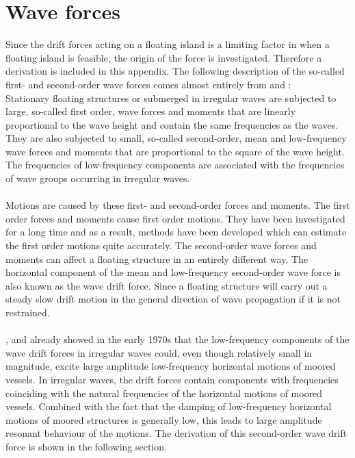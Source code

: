 \chapter{Wave forces}
\label{appendix:derivation 2nd order wave force}


Since the drift forces acting on a floating island is a limiting factor in when a floating island is feasible, the origin of the force is investigated. Therefore a derivation is included in this appendix. The following description of the so-called first- and second-order wave forces comes almost entirely from \parencite{Pinkster1980} and \parencite{journee2000offshore}:\\
Stationary floating structures or submerged in irregular waves are subjected to large, so-called first order, wave forces and moments that are linearly proportional to the wave height and contain the same frequencies as the waves. They are also subjected to small, so-called second-order, mean and low-frequency wave forces and moments that are proportional to the square of the wave height. The frequencies of low-frequency components are associated with the frequencies of wave groups occurring in irregular waves. \\
\\
Motions are caused by these first- and second-order forces and moments. The first order forces and moments cause first order motions. They have been investigated for a long time and as a result, methods have been developed which can estimate the first order motions quite accurately. The second-order wave forces and moments can affect a floating structure in an entirely different way. The horizontal component of the mean and low-frequency second-order wave force is also known as the wave drift force. Since a floating structure will carry out a steady slow drift motion in the general direction of wave propagation if it is not restrained. \\
\\
\parencite{verhagen1970low}, \parencite{hsu1972analysis} and \parencite{remery1972slow} already showed in the early 1970s that the low-frequency components of the wave drift forces in irregular waves could, even though relatively small in magnitude, excite large amplitude low-frequency horizontal motions of moored vessels. In irregular waves, the drift forces contain components with frequencies coinciding with the natural frequencies of the horizontal motions of moored vessels. Combined with the fact that the damping of low-frequency horizontal motions of moored structures is generally low, this leads to large amplitude resonant behaviour of the motions. The derivation of this second-order wave drift force is shown in the following section.

